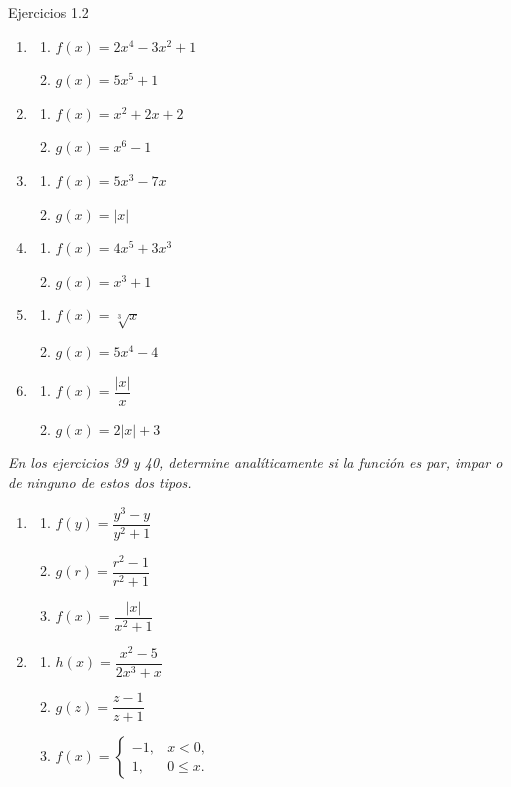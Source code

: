 \documentclass[aspectratio=169,10pt]{beamer}
\begin{document}
\begin{frame}{Ejercicios 1.2}
\begin{enumerate}
\item \begin{enumerate}\item $f(x)=2x^4-3x^2+1$ \item $g(x)=5x^5+1$\end{enumerate}
\item \begin{enumerate}\item $f(x)=x^2+2x+2$ \item $g(x)=x^6-1$\end{enumerate}
\item \begin{enumerate}\item $f(x)=5x^3-7x$ \item $g(x)=|x|$\end{enumerate}
\item \begin{enumerate}\item $f(x)=4x^5+3x^3$ \item $g(x)=x^3+1$\end{enumerate}
\item \begin{enumerate}\item $f(x)=\sqrt[3]{x}$ \item $g(x)=5x^4-4$\end{enumerate}
\item \begin{enumerate}\item $f(x)=\dfrac{|x|}{x}$ \item $g(x)=2|x|+3$\end{enumerate}
\end{enumerate}

\textit{En los ejercicios 39 y 40, determine analíticamente si la función es par, impar o de ninguno de estos dos tipos.}

\begin{enumerate}
\item \begin{enumerate}\item $f(y)=\dfrac{y^3-y}{y^2+1}$ \item $g(r)=\dfrac{r^2-1}{r^2+1}$ \item $f(x)=\dfrac{|x|}{x^2+1}$\end{enumerate}
\item \begin{enumerate}\item $h(x)=\dfrac{x^2-5}{2x^3+x}$ \item $g(z)=\dfrac{z-1}{z+1}$ \item $f(x)=\begin{cases}-1,&x<0,\\1,&0\le x.\end{cases}$\end{enumerate}
\end{enumerate}


\end{frame}
\end{document}
